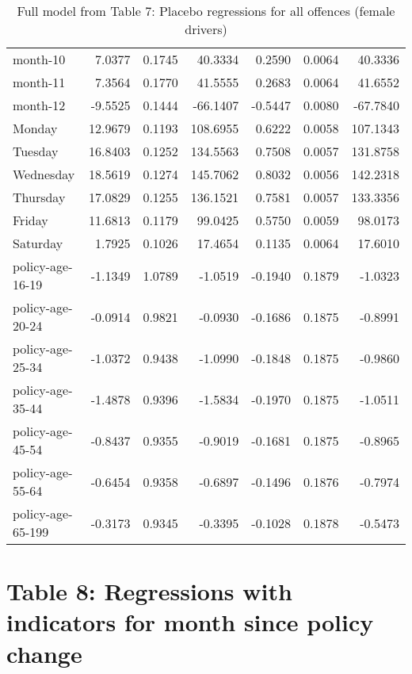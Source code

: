 \documentclass[10pt]{article}
\begin{document}
\begin{table}[ht]
\begin{tabular}{lrrrrrr}
  month-10 & 7.0377 & 0.1745 & 40.3334 & 0.2590 & 0.0064 & 40.3336 \\ 
  month-11 & 7.3564 & 0.1770 & 41.5555 & 0.2683 & 0.0064 & 41.6552 \\ 
  month-12 & -9.5525 & 0.1444 & -66.1407 & -0.5447 & 0.0080 & -67.7840 \\ 
  Monday & 12.9679 & 0.1193 & 108.6955 & 0.6222 & 0.0058 & 107.1343 \\ 
  Tuesday & 16.8403 & 0.1252 & 134.5563 & 0.7508 & 0.0057 & 131.8758 \\ 
  Wednesday & 18.5619 & 0.1274 & 145.7062 & 0.8032 & 0.0056 & 142.2318 \\ 
  Thursday & 17.0829 & 0.1255 & 136.1521 & 0.7581 & 0.0057 & 133.3356 \\ 
  Friday & 11.6813 & 0.1179 & 99.0425 & 0.5750 & 0.0059 & 98.0173 \\ 
  Saturday & 1.7925 & 0.1026 & 17.4654 & 0.1135 & 0.0064 & 17.6010 \\ 
  policy-age-16-19 & -1.1349 & 1.0789 & -1.0519 & -0.1940 & 0.1879 & -1.0323 \\ 
  policy-age-20-24 & -0.0914 & 0.9821 & -0.0930 & -0.1686 & 0.1875 & -0.8991 \\ 
  policy-age-25-34 & -1.0372 & 0.9438 & -1.0990 & -0.1848 & 0.1875 & -0.9860 \\ 
  policy-age-35-44 & -1.4878 & 0.9396 & -1.5834 & -0.1970 & 0.1875 & -1.0511 \\ 
  policy-age-45-54 & -0.8437 & 0.9355 & -0.9019 & -0.1681 & 0.1875 & -0.8965 \\ 
  policy-age-55-64 & -0.6454 & 0.9358 & -0.6897 & -0.1496 & 0.1876 & -0.7974 \\ 
  policy-age-65-199 & -0.3173 & 0.9345 & -0.3395 & -0.1028 & 0.1878 & -0.5473 \\ 
   \hline
\end{tabular}
\caption{Full model from Table 7: Placebo regressions for all offences (female drivers)} 
\label{tab_7_all_pts_F}
\end{table}


\clearpage
\pagebreak




\section{Table 8: Regressions with indicators for month since policy change}
\end{document}
